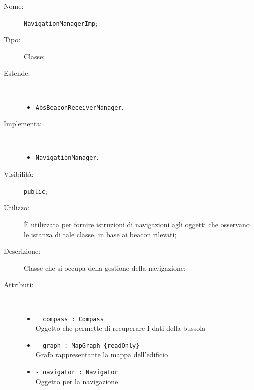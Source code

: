 \documentclass[../DefinizioneDiProdotto.tex]{subfiles}
\begin{document}
\begin{description}
	\item[Nome:] \texttt{NavigationManagerImp};
	\item[Tipo:] Classe;
	\item[Estende:] \
	\begin{itemize}
		\item \texttt{AbsBeaconReceiverManager}.
	\end{itemize}
	\item[Implementa:] \
	\begin{itemize}
		\item \texttt{NavigationManager}.
		
	\end{itemize}
	\item[Visibilità:] \texttt{public};
	\item[Utilizzo:] È utilizzata per fornire istruzioni di navigazioni agli oggetti che osservano le istanza di tale classe, in base ai beacon rilevati;
	\item[Descrizione:] Classe che si occupa della gestione della navigazione;
	\item[Attributi:] \
	\begin{itemize}
		\item \texttt{~ compass : Compass}\\
		Oggetto che permette di recuperare I dati della bussola
		
		\item \texttt{- graph : MapGraph \{readOnly\}}\\
		Grafo rappresentante la mappa dell'edificio
		
		\item \texttt{- navigator : Navigator}\\
		Oggetto per la navigazione
		

\end{itemize}
\end{description}
\end{document}

